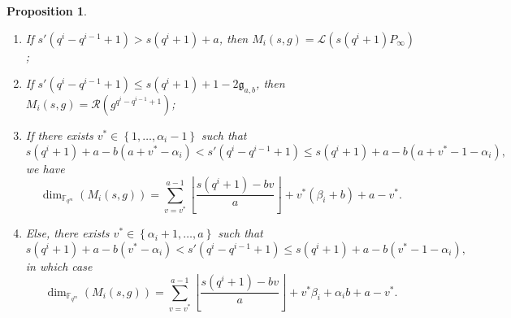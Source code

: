 \documentclass[a4paper]{amsart}
\newtheorem{proposition}[thm]{Proposition}
\theoremstyle{definition}
\theoremstyle{remark}
\newcommand{\calL}{\mathcal{L}}
\newcommand{\calR}{\mathcal{R}}
\newcommand{\fqm}{\mathbb{F}_{q^m}}
\newcommand{\set}[1]{\left\{#1\right\}}
\begin{document}
\begin{proposition} \label{prop:dim_M_i's}
    \begin{enumerate}
        \item If $s'(q^i-q^{i-1}+1) > s(q^i+1)+a$, then $M_i(s,g) = \calL(s(q^i+1)P_\infty)$;
        
        \item If $s'(q^i-q^{i-1}+1) \leq s(q^i+1)+1-2\mathfrak{g}_{a,b}$, then $M_i(s,g) = \calR(g^{q^{i}-q^{i-1}+1})$;
        
        \item If there exists $v^* \in \set{1,\dots,\alpha_i-1}$ such that
        $$ s(q^i+1)+a-b(a+v^*-\alpha_i) < s'(q^i-q^{i-1}+1) \leq  s(q^i+1)+a-b(a+v^*-1-\alpha_i),$$
        we have 
          $$\dim_{\fqm}(M_i(s,g)) = \sum\limits_{v=v^*}^{a-1} \left\lfloor \dfrac{s(q^i+1)-bv}{a} \right\rfloor + v^*(\beta_i+b) + a-v^*.$$
        
        \item Else, there exists $v^* \in \set{\alpha_i+1,\dots,a}$ such that
        $$ s(q^i+1)+a-b(v^*-\alpha_i) < s'(q^i-q^{i-1}+1) \leq  s(q^i+1)+a-b(v^*-1-\alpha_i),$$
        in which case 
        $$\dim_{\fqm}(M_i(s,g)) = \sum\limits_{v=v^*}^{a-1} \left\lfloor \dfrac{s(q^i+1)-bv}{a} \right\rfloor + v^*\beta_i + \alpha_ib +a-v^*.$$
    \end{enumerate}
\end{proposition}
\end{document}
